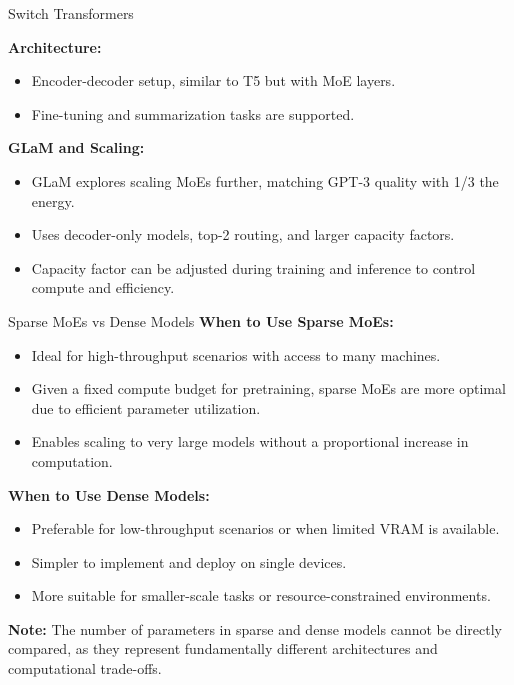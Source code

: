 \begin{frame}[allowframebreaks]{Switch Transformers}
\framebreak

    \textbf{Architecture:}
    \begin{itemize}
        \item Encoder-decoder setup, similar to T5 but with MoE layers.
        \item Fine-tuning and summarization tasks are supported.
    \end{itemize}

    \textbf{GLaM and Scaling:}
    \begin{itemize}
        \item GLaM explores scaling MoEs further, matching GPT-3 quality with 1/3 the energy.
        \item Uses decoder-only models, top-2 routing, and larger capacity factors.
        \item Capacity factor can be adjusted during training and inference to control compute and efficiency.
    \end{itemize}
\end{frame}

\begin{frame}{Sparse MoEs vs Dense Models}
    \textbf{When to Use Sparse MoEs:}
    \begin{itemize}
        \item Ideal for high-throughput scenarios with access to many machines.
        \item Given a fixed compute budget for pretraining, sparse MoEs are more optimal due to efficient parameter utilization.
        \item Enables scaling to very large models without a proportional increase in computation.
    \end{itemize}

    \textbf{When to Use Dense Models:}
    \begin{itemize}
        \item Preferable for low-throughput scenarios or when limited VRAM is available.
        \item Simpler to implement and deploy on single devices.
        \item More suitable for smaller-scale tasks or resource-constrained environments.
    \end{itemize}

    \textbf{Note:} The number of parameters in sparse and dense models cannot be directly compared, as they represent fundamentally different architectures and computational trade-offs.
\end{frame}


